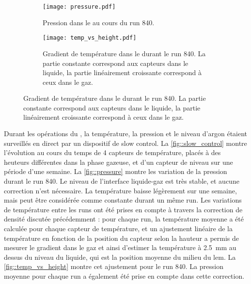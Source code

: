       \begin{figure}[htbp]
        \centering
        \begin{subfigure}[t]{0.48\textwidth}
          \centering
          \texttt{[image: pressure.pdf]}
          \caption[Pression dans le \TOO{} au cours du run 840]{\label{fig::pressure}Pression dans le \TOO{} au cours du run 840.}
        \end{subfigure}\hfill
        \begin{subfigure}[t]{0.48\textwidth}
          \centering
          \texttt{[image: temp\_vs\_height.pdf]}
          \caption[Gradient de température dans le \TOO{} durant le run 840]{\label{fig::temp_vs_height}Gradient de température dans le \TOO{} durant le run 840. La partie constante correspond aux capteurs dans le liquide, la partie linéairement croissante correspond à ceux dans le gaz.}
        \end{subfigure}
      \end{figure}
      
      Durant les opérations du \TOO{}, la température, la pression et le niveau d'argon étaient surveillés en direct par un dispositif de slow control. La \autoref{fig::slow_control} montre l'évolution au cours du temps de 4 capteurs de température, placés à des heuteurs différentes dans la phase gazeuse, et d'un capteur de niveau sur une période d'une semaine. La \autoref{fig::pressure} montre les variation de la pression durant le run 840. Le niveau de l'interface liquide-gaz est très stable, et aucune correction n'est nécessaire. La température baisse légèrement sur une semaine, mais peut être considérée comme constante durant un même run. Les variations de température entre les runs ont été prises en compte à travers la correction de densité discutée précédemment : pour chaque run, la température moyenne a été calculée pour chaque capteur de température, et un ajustement linéaire de la température en fonction de la position du capteur selon la hauteur a permis de mesurer le gradient dans le gaz et ainsi d'estimer la température à \SI{2.5}{\milli\meter} au dessus du niveau du liquide, qui est la position moyenne du milieu du \gls{lem}. La \autoref{fig::temp_vs_height} montre cet ajustement pour le run 840. La pression moyenne pour chaque run a également été prise en compte dans cette correction.

